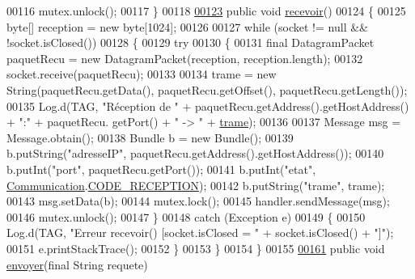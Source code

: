 \begin{DoxyCode}
00116         mutex.unlock();
00117     \}
00118 
\hyperlink{classcom_1_1lasalle_1_1meeting_1_1_communication_a0344b79faa04dded3468fb8dda6baa81}{00123}     \textcolor{keyword}{public} \textcolor{keywordtype}{void} \hyperlink{classcom_1_1lasalle_1_1meeting_1_1_communication_a0344b79faa04dded3468fb8dda6baa81}{recevoir}()
00124     \{
00125         byte[] reception = \textcolor{keyword}{new} byte[1024];
00126 
00127         \textcolor{keywordflow}{while} (socket != null && !socket.isClosed())
00128         \{
00129             \textcolor{keywordflow}{try}
00130             \{
00131                 \textcolor{keyword}{final} DatagramPacket paquetRecu = \textcolor{keyword}{new} DatagramPacket(reception, reception.length);
00132                 socket.receive(paquetRecu);
00133 
00134                 trame = \textcolor{keyword}{new} String(paquetRecu.getData(), paquetRecu.getOffset(), paquetRecu.getLength());
00135                 Log.d(TAG, \textcolor{stringliteral}{"Réception de "} + paquetRecu.getAddress().getHostAddress() + \textcolor{stringliteral}{":"} + paquetRecu.
      getPort() + \textcolor{stringliteral}{" -> "} + \hyperlink{classcom_1_1lasalle_1_1meeting_1_1_communication_a1c5c3782ce80717dab95ed5335929333}{trame});
00136 
00137                 Message msg = Message.obtain();
00138                 Bundle b = \textcolor{keyword}{new} Bundle();
00139                 b.putString(\textcolor{stringliteral}{"adresseIP"}, paquetRecu.getAddress().getHostAddress());
00140                 b.putInt(\textcolor{stringliteral}{"port"}, paquetRecu.getPort());
00141                 b.putInt(\textcolor{stringliteral}{"etat"}, \hyperlink{classcom_1_1lasalle_1_1meeting_1_1_communication}{Communication}.\hyperlink{classcom_1_1lasalle_1_1meeting_1_1_communication_a9cd85019614f2434af944c955519dfd1}{CODE\_RECEPTION});
00142                 b.putString(\textcolor{stringliteral}{"trame"}, trame);
00143                 msg.setData(b);
00144                 mutex.lock();
00145                 handler.sendMessage(msg);
00146                 mutex.unlock();
00147             \}
00148             \textcolor{keywordflow}{catch} (Exception e)
00149             \{
00150                 Log.d(TAG, \textcolor{stringliteral}{"Erreur recevoir() [socket.isClosed = "} + socket.isClosed() + \textcolor{stringliteral}{"]"});
00151                 e.printStackTrace();
00152             \}
00153         \}
00154     \}
00155 
\hyperlink{classcom_1_1lasalle_1_1meeting_1_1_communication_a1566200ca56ba63eec13d0ce37e6c7ee}{00161}     \textcolor{keyword}{public} \textcolor{keywordtype}{void} \hyperlink{classcom_1_1lasalle_1_1meeting_1_1_communication_a1566200ca56ba63eec13d0ce37e6c7ee}{envoyer}(\textcolor{keyword}{final} String requete)

\end{DoxyCode}
